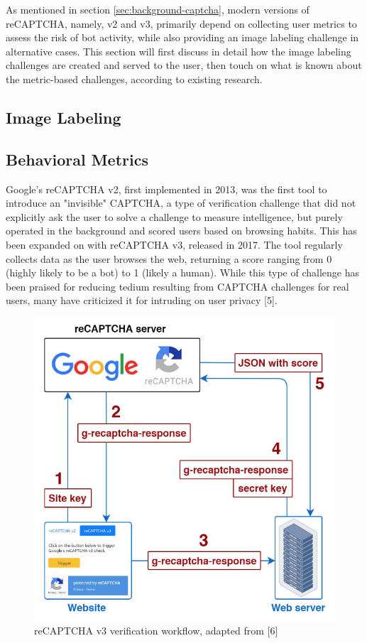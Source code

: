 \documentclass[sigplan,screen,nonacm]{acmart-tagged}
\begin{document}

As mentioned in section \ref{sec:background-captcha}, modern versions of reCAPTCHA, namely, v2 and v3, primarily depend on collecting user metrics to assess the risk of bot activity, while also providing an image labeling challenge in alternative cases. This section will first discuss in detail how the image labeling challenges are created and served to the user, then touch on what is known about the metric-based challenges, according to existing research.

\subsection{Image Labeling}
\label{sec:visual}


\subsection{Behavioral Metrics}
\label{sec:metrics}

Google's reCAPTCHA v2, first implemented in 2013, was the first tool to introduce an "invisible" CAPTCHA, a type of verification challenge that did not explicitly ask the user to solve a challenge to measure intelligence, but purely operated in the background and scored users based on browsing habits. This has been expanded on with reCAPTCHA v3, released in 2017. The tool regularly collects data as the user browses the web, returning a score ranging from 0 (highly likely to be a bot) to 1 (likely a human). While this type of challenge has been praised for reducing tedium resulting from CAPTCHA challenges for real users, many have criticized it for intruding on user privacy [5].  

\begin{figure}[h]
\centering
\includegraphics[width=0.7\linewidth]{resources/v3-workflow}
\caption{reCAPTCHA v3 verification workflow, adapted from [6]}
\label{fig:v3}
\end{figure}
\end{document}
